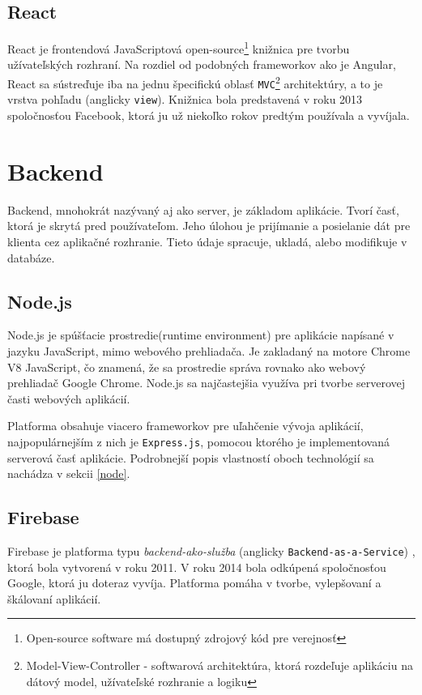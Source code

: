 \subsection{React}
React je frontendová JavaScriptová open-source\footnote{Open-source software má dostupný zdrojový kód pre verejnosť} knižnica pre tvorbu užívateľských rozhraní. Na rozdiel od podobných frameworkov ako je Angular, React\cite{react} sa sústreďuje iba na jednu špecifickú oblasť \texttt{MVC}\footnote{Model-View-Controller - softwarová architektúra, ktorá rozdeľuje aplikáciu na dátový model, užívateľské rozhranie a logiku} architektúry, a to je vrstva pohľadu (anglicky \texttt{view}). Knižnica bola predstavená v roku 2013 spoločnosťou Facebook, ktorá ju už niekoľko rokov predtým používala a vyvíjala. 

\section{Backend}
Backend, mnohokrát nazývaný aj ako server, je základom aplikácie. Tvorí časť, ktorá je skrytá pred používateľom. Jeho úlohou je prijímanie a posielanie dát pre klienta cez aplikačné rozhranie. Tieto údaje spracuje, ukladá, alebo modifikuje v databáze.

\subsection{Node.js}
Node.js\cite{nodejs} je spúšťacie prostredie(runtime environment) pre aplikácie napísané v jazyku JavaScript, mimo webového prehliadača. Je zakladaný na motore Chrome V8 JavaScript, čo znamená, že sa prostredie správa rovnako ako webový prehliadač Google Chrome. Node.js sa najčastejšia využíva pri tvorbe serverovej časti webových aplikácií.

Platforma obsahuje viacero frameworkov pre uľahčenie vývoja aplikácií, najpopulárnejším z nich je \texttt{Express.js}, pomocou ktorého je implementovaná serverová časť aplikácie. Podrobnejší popis vlastností oboch technológií sa nachádza v sekcii \ref{node}.

\subsection{Firebase}
Firebase\cite{firebase} je platforma typu \textit{backend-ako-služba} (anglicky \texttt{Backend-as-a-Service}) , ktorá bola vytvorená v roku 2011. V roku 2014 bola odkúpená spoločnosťou Google, ktorá ju doteraz vyvíja. Platforma pomáha v tvorbe, vylepšovaní a škálovaní aplikácií.

